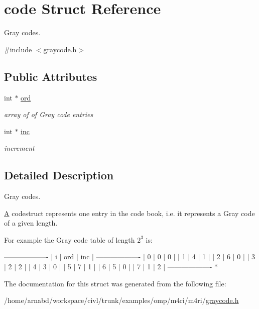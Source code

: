 \hypertarget{structcode}{}\section{code Struct Reference}
\label{structcode}


Gray codes.  




{\ttfamily \#include $<$graycode.\+h$>$}

\subsection*{Public Attributes}
\begin{DoxyCompactItemize}
\item 
\hypertarget{structcode_a562c6afe7eb9a667028f7014c7406ce1}{}int $\ast$ \hyperlink{structcode_a562c6afe7eb9a667028f7014c7406ce1}{ord}\label{structcode_a562c6afe7eb9a667028f7014c7406ce1}

\begin{DoxyCompactList}\small\item\em array of of Gray code entries \end{DoxyCompactList}\item 
\hypertarget{structcode_a9a3e7cee03a2df54d329c362323d4c50}{}int $\ast$ \hyperlink{structcode_a9a3e7cee03a2df54d329c362323d4c50}{inc}\label{structcode_a9a3e7cee03a2df54d329c362323d4c50}

\begin{DoxyCompactList}\small\item\em increment \end{DoxyCompactList}\end{DoxyCompactItemize}


\subsection{Detailed Description}
Gray codes. 

\hyperlink{structA}{A} codestruct represents one entry in the code book, i.\+e. it represents a Gray code of a given length.

For example the Gray code table of length $2^3$ is\+:

\begin{DoxyVerb}-------------------
|  i  | ord | inc |
-------------------
|  0  |  0  |  0  | 
|  1  |  4  |  1  |
|  2  |  6  |  0  |
|  3  |  2  |  2  |
|  4  |  3  |  0  |
|  5  |  7  |  1  |
|  6  |  5  |  0  |
|  7  |  1  |  2  |
-------------------
 * \end{DoxyVerb}
 

The documentation for this struct was generated from the following file\+:\begin{DoxyCompactItemize}
\item 
/home/arnabd/workspace/civl/trunk/examples/omp/m4ri/m4ri/\hyperlink{graycode_8h}{graycode.\+h}\end{DoxyCompactItemize}

